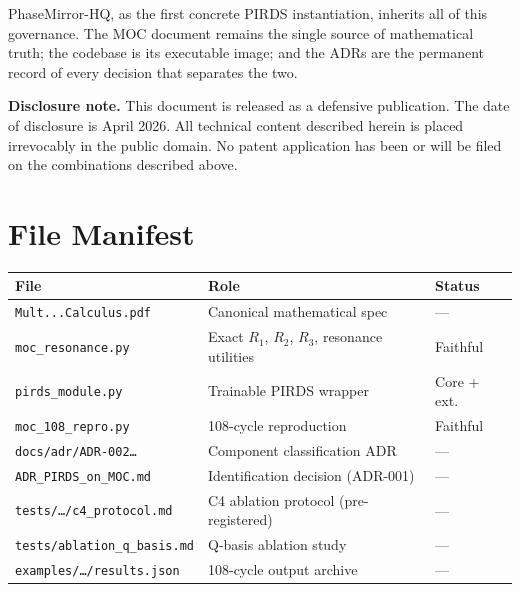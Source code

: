 \documentclass[11pt,a4paper]{article}
\theoremstyle{plain}
\theoremstyle{definition}
\theoremstyle{remark}
\begin{document}
PhaseMirror-HQ, as the first concrete PIRDS instantiation, inherits all of this governance.
The MOC document remains the single source of mathematical truth; the codebase is its
executable image; and the ADRs are the permanent record of every decision that separates
the two.

\vspace{1.5em}
\begin{tcolorbox}[notebox]
  \textbf{Disclosure note.} This document is released as a defensive publication.
  The date of disclosure is April 2026. All technical content described herein is
  placed irrevocably in the public domain. No patent application has been or will
  be filed on the combinations described above.
\end{tcolorbox}

\appendix

\section{File Manifest}
\label{app:manifest}

\begin{center}
\begin{tabularx}{\textwidth}{p{5.8cm}Xl}
  \toprule
  File & Role & Status \\
  \midrule
  \texttt{Mult...Calculus.pdf} & Canonical mathematical spec & --- \\
  \texttt{moc\_resonance.py} & Exact $R_1$, $R_2$, $R_3$, resonance utilities & Faithful \\
  \texttt{pirds\_module.py} & Trainable PIRDS wrapper & Core + ext. \\
  \texttt{moc\_108\_repro.py} & 108-cycle reproduction & Faithful \\
  \texttt{docs/adr/ADR-002\ldots} & Component classification ADR & --- \\
  \texttt{ADR\_PIRDS\_on\_MOC.md} & Identification decision (ADR-001) & --- \\
  \texttt{tests/\ldots/c4\_protocol.md} & C4 ablation protocol (pre-registered) & --- \\
  \texttt{tests/ablation\_q\_basis.md} & Q-basis ablation study & --- \\
  \texttt{examples/\ldots/results.json} & 108-cycle output archive & --- \\
  \bottomrule
\end{tabularx}
\end{center}
\end{document}
